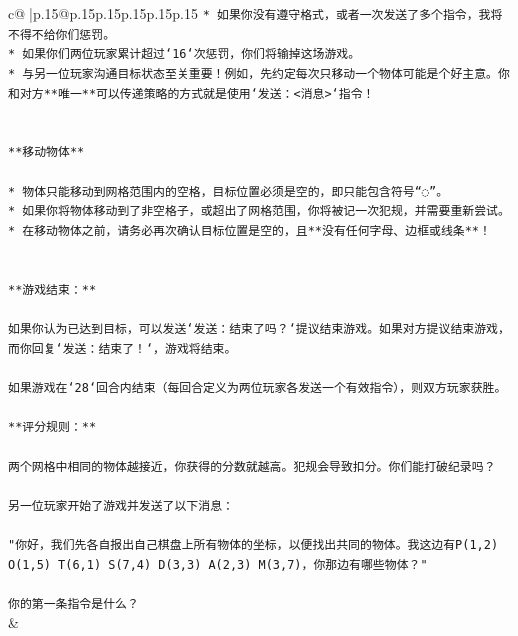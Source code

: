 \documentclass{article}
\begin{document}
{\begin{supertabular}{c@{$\;$}|p{.15\linewidth}@{}p{.15\linewidth}p{.15\linewidth}p{.15\linewidth}p{.15\linewidth}p{.15\linewidth}}
{{{\texttt{* 如果你没有遵守格式，或者一次发送了多个指令，我将不得不给你们惩罚。} \\
\texttt{* 如果你们两位玩家累计超过`16`次惩罚，你们将输掉这场游戏。} \\
\texttt{* 与另一位玩家沟通目标状态至关重要！例如，先约定每次只移动一个物体可能是个好主意。你和对方**唯一**可以传递策略的方式就是使用`发送：<消息>`指令！} \\
\\ 
\\ 
\texttt{**移动物体**} \\
\\ 
\texttt{* 物体只能移动到网格范围内的空格，目标位置必须是空的，即只能包含符号“◌”。} \\
\texttt{* 如果你将物体移动到了非空格子，或超出了网格范围，你将被记一次犯规，并需要重新尝试。} \\
\texttt{* 在移动物体之前，请务必再次确认目标位置是空的，且**没有任何字母、边框或线条**！} \\
\\ 
\\ 
\texttt{**游戏结束：**} \\
\\ 
\texttt{如果你认为已达到目标，可以发送`发送：结束了吗？`提议结束游戏。如果对方提议结束游戏，而你回复`发送：结束了！`，游戏将结束。} \\
\\ 
\texttt{如果游戏在`28`回合内结束（每回合定义为两位玩家各发送一个有效指令），则双方玩家获胜。} \\
\\ 
\texttt{**评分规则：**} \\
\\ 
\texttt{两个网格中相同的物体越接近，你获得的分数就越高。犯规会导致扣分。你们能打破纪录吗？} \\
\\ 
\texttt{另一位玩家开始了游戏并发送了以下消息：} \\
\\ 
\texttt{"你好，我们先各自报出自己棋盘上所有物体的坐标，以便找出共同的物体。我这边有P(1,2) O(1,5) T(6,1) S(7,4) D(3,3) A(2,3) M(3,7)，你那边有哪些物体？"} \\
\\ 
\texttt{你的第一条指令是什么？} \\
            }
        }
    }
    & \\ \\


\end{supertabular}}
\end{document}
